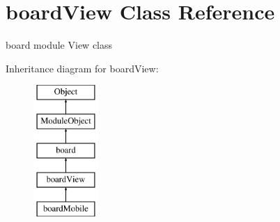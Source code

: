 \hypertarget{classboardView}{\section{board\-View Class Reference}
\label{classboardView}
}


board module View class  


Inheritance diagram for board\-View\-:\begin{figure}[H]
\begin{center}
\leavevmode
\includegraphics[height=5.000000cm]{classboardView}
\end{center}
\end{figure}
